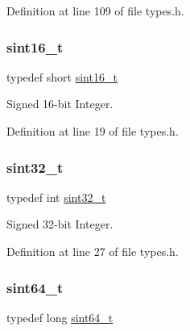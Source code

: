 Definition at line 109 of file types.\+h.

\mbox{\label{a00134_a5881659ed80e940350d12831204375cd_a5881659ed80e940350d12831204375cd}} 
\subsubsection{\texorpdfstring{sint16\+\_\+t}{sint16\_t}}
{\footnotesize\ttfamily typedef short \hyperlink{a00134_a5881659ed80e940350d12831204375cd_a5881659ed80e940350d12831204375cd}{sint16\+\_\+t}}



Signed 16-\/bit Integer. 



Definition at line 19 of file types.\+h.

\mbox{\label{a00134_ad838970452fe561cb8e0550cac5336be_ad838970452fe561cb8e0550cac5336be}} 
\subsubsection{\texorpdfstring{sint32\+\_\+t}{sint32\_t}}
{\footnotesize\ttfamily typedef int \hyperlink{a00134_ad838970452fe561cb8e0550cac5336be_ad838970452fe561cb8e0550cac5336be}{sint32\+\_\+t}}



Signed 32-\/bit Integer. 



Definition at line 27 of file types.\+h.

\mbox{\label{a00134_a04761b9e7480e1e48b0d392da17fd5d4_a04761b9e7480e1e48b0d392da17fd5d4}} 
\subsubsection{\texorpdfstring{sint64\+\_\+t}{sint64\_t}}
{\footnotesize\ttfamily typedef long \hyperlink{a00134_a04761b9e7480e1e48b0d392da17fd5d4_a04761b9e7480e1e48b0d392da17fd5d4}{sint64\+\_\+t}}



